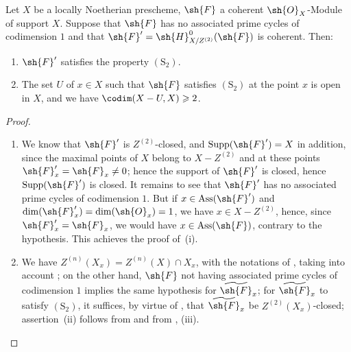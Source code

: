 \begin{corollary}[5.10.15]
\label{IV.5.10.15}
Let $X$ be a locally Noetherian prescheme, $\sh{F}$ a coherent $\sh{O}_X$-Module of support $X$.
Suppose that $\sh{F}$ has no associated prime cycles of codimension $1$ and that $\sh{F}'=\sh{H}^0_{X/Z^{(2)}}(\sh{F})$ is coherent.
Then:
\begin{enumerate}[label=\emph{\roman*)}]
  \item $\sh{F}'$ satisfies the property $(\mathrm{S}_2)$.


  \item The set $U$ of $x\in X$ such that $\sh{F}$ satisfies $(\mathrm{S}_2)$ at the point $x$  is open in $X$, and we have $\codim(X-U,X)\geqslant 2$.
\end{enumerate}
\end{corollary}

\begin{proof}
\begin{enumerate}[label=\emph{\roman*)}]
  \item We know  that $\sh{F}'$ is $Z^{(2)}$-closed, and $\operatorname{Supp}(\sh{F}')=X$ in addition, since the maximal points of $X$ belong to $X-Z^{(2)}$ and at these points $\sh{F}'_x=\sh{F}_x\neq 0$; hence the support of $\sh{F}'$ is closed, hence $\operatorname{Supp}(\sh{F}')$ is closed.
It remains to see that $\sh{F}'$ has no associated prime cycles of codimension $1$.
But if $x\in\operatorname{Ass}(\sh{F}')$ and $\dim(\sh{F}'_x)=\dim(\sh{O}_x)=1$, we have $x\in X-Z^{(2)}$, hence, since $\sh{F}'_x=\sh{F}_x$, we would have $x\in\operatorname{Ass}(\sh{F})$, contrary to the hypothesis.
This achieves the proof of~(i).
  \item We have $Z^{(n)}(X_x)=Z^{(n)}(X)\cap X_x$, with the notations of , taking into account ; on the other hand, $\sh{F}$ not having associated prime cycles of codimension $1$ implies the same hypothesis for $\widetilde{\sh{F}}_x$; for $\widetilde{\sh{F}}_x$ to satisfy $(\mathrm{S}_2)$, it suffices, by virtue of , that $\widetilde{\sh{F}}_x$ be $Z^{(2)}(X_x)$-closed; assertion~(ii) follows from  and from , (iii).
\end{enumerate}
\end{proof}

